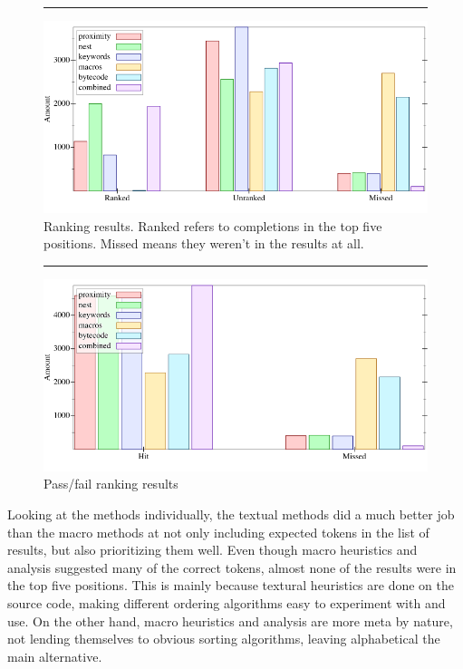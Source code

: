 \documentclass[ms,electronic,twosidetoc,letterpaper,chaptercenter,parttop,lol,lof,lot]{byumsphd}
\begin{document}
\begin{figure}[h]
\centering
\hrule
\includegraphics[width=1.0\textwidth]{../output/synthesis/ranker/Remove-combined.png}
\caption{Ranking results. Ranked refers to completions in the top five positions. Missed means they weren't in the results at all.}
\label{ranker-combined}
\end{figure}

\begin{figure}[h]
\centering
\hrule
\includegraphics[width=1.0\textwidth]{../output/synthesis/ranker/Remove-uber-combined.png}
\caption{Pass/fail ranking results}
\label{ranker-uber-combined}
\end{figure}

Looking at the methods individually, the textual methods did a much better job than the macro methods at not only including expected tokens in the list of results, but also prioritizing them well.
Even though macro heuristics and analysis suggested many of the correct tokens, almost none of the results were in the top five positions.
This is mainly because textural heuristics are done on the source code, making different ordering algorithms easy to experiment with and use.
On the other hand, macro heuristics and analysis are more meta by nature, not lending themselves to obvious sorting algorithms, leaving alphabetical the main alternative.
\end{document}
